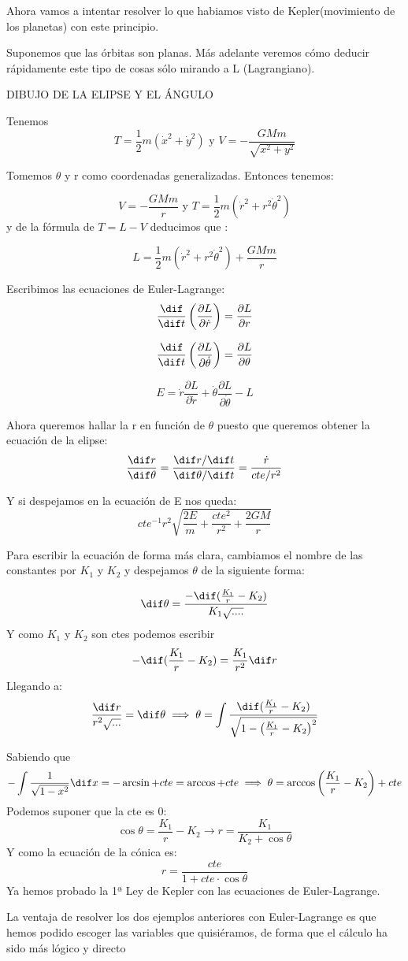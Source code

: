 \begin{example}
	Ahora vamos a intentar resolver lo que habiamos visto de Kepler(movimiento de los planetas) con este principio.

Suponemos que las órbitas son planas. Más adelante veremos cómo deducir rápidamente este tipo de cosas sólo mirando a L (Lagrangiano).

DIBUJO DE LA ELIPSE Y EL ÁNGULO

Tenemos
\[T = \frac{1}{2} m(\dot x^2 + \dot y^2) \text{ y }V = -\frac{GMm}{\sqrt{x^2 + y^2}}\]

Tomemos $\theta$ y r como coordenadas generalizadas. Entonces tenemos:


$$V= -\frac{GMm}{r}\text{ y } T= \frac{1}{2} m (\dot r^2 + r^2 \dot\theta^2)$$
y de la fórmula de $T= L-V$ deducimos que :

$$L = \frac{1}{2} m (\dot r^2 + r^2 \dot\theta^2) + \frac{GMm}{r}$$

Escribimos las ecuaciones de Euler-Lagrange:
$$\frac{\dif}{\dif t}\left(\frac{\partial L}{\partial \dot r}\right)= \frac{\partial L}{\partial r}$$

$$\frac{\dif}{\dif t}\left(\frac{\partial L}{\partial \dot \theta}\right)= \frac{\partial L}{\partial \theta}$$

$$E= \dot r \frac{\partial L}{\partial \dot r} + \dot{\theta }\frac{\partial L}{\partial \dot{\theta}} - L$$

Ahora queremos hallar la r en función de $\theta$ puesto que queremos obtener la ecuación de la elipse:
$$\frac{\dif r}{\dif \theta} = \frac{\dif r / \dif t}{\dif \theta / \dif t}= \frac{\dot r}{cte/r^2} $$

Y si despejamos en la ecuación de E nos queda: $$cte^{-1}r^2\sqrt{\frac{2E}{m}+\frac{cte^2}{r^2}+\frac{2GM}{r}}$$

Para escribir la ecuación de forma más clara, cambiamos el nombre de las constantes por $K_1$ y $K_2$ y despejamos $\theta$ de la siguiente forma:

\[\dif \theta = \frac{-\dif(\frac{K_1}{r} - K_2)}{K_1 \sqrt{....}}\]
Y como $K_1$ y $K_2$ son ctes podemos escribir
\[-\dif(\frac{K_1}{r} - K_2) = \frac{K_1}{r^2}\dif r\]
Llegando a:
$$ \frac{\dif r}{r^2\sqrt{...}}=\dif \theta \implies \theta = \int \frac{\dif ( \frac{K_1}{r} - K_2 )}{\sqrt{1 - \left(\frac{K_1}{r} - K_2\right)^2}}$$

Sabiendo que
$$- \int \frac{1}{\sqrt{1-x^2}}\dif x = -\arcsin + cte = \arccos + cte \implies \theta = \arccos \left( \frac{K_1}{r} - K_2\right) + cte$$
Podemos suponer que la cte es 0:
$$ \cos\theta = \frac{K_1}{r} - K_2 \rightarrow r = \frac{K_1}{K_2 + \cos\theta}$$
Y como la ecuación de la cónica es:
$$ r = \frac{cte}{1 + cte \cdot \cos\theta}$$
Ya hemos probado la 1ª Ley de Kepler con las ecuaciones de Euler-Lagrange.\\
\end{example}

La ventaja de resolver los dos ejemplos anteriores con Euler-Lagrange es que hemos podido escoger las variables que quisiéramos, de forma que el cálculo ha sido más lógico y directo\\





